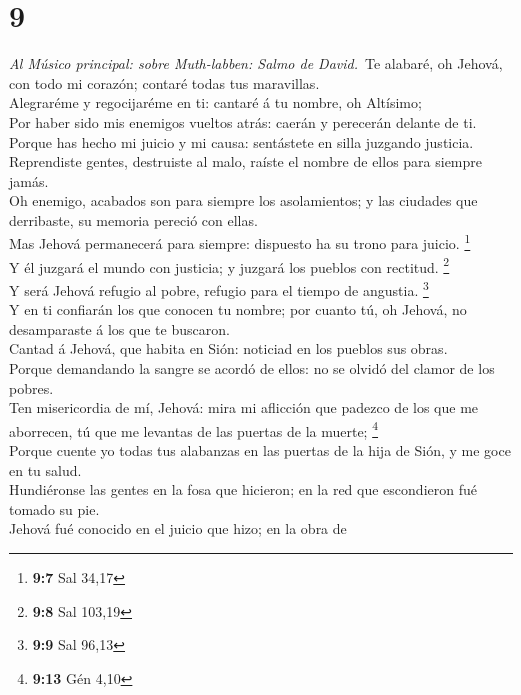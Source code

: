 \hypertarget{section-8}{%
\section{9}\label{section-8}}

 \emph{Al Músico principal: sobre Muth-labben: Salmo de
David.}~Te alabaré, oh Jehová, con todo mi corazón; contaré todas tus
maravillas.\\
 Alegraréme y regocijaréme en ti: cantaré á tu nombre, oh
Altísimo;\\
 Por haber sido mis enemigos vueltos atrás: caerán y
perecerán delante de ti.\\
 Porque has hecho mi juicio y mi causa: sentástete en silla
juzgando justicia.\\
 Reprendiste gentes, destruiste al malo, raíste el nombre de
ellos para siempre jamás.\\
 Oh enemigo, acabados son para siempre los asolamientos; y
las ciudades que derribaste, su memoria pereció con ellas.\\
 Mas Jehová permanecerá para siempre: dispuesto ha su trono
para juicio. \footnote{\textbf{9:7} Sal 34,17}\\
 Y él juzgará el mundo con justicia; y juzgará los pueblos
con rectitud. \footnote{\textbf{9:8} Sal 103,19}\\
 Y será Jehová refugio al pobre, refugio para el tiempo de
angustia. \footnote{\textbf{9:9} Sal 96,13}\\
 Y en ti confiarán los que conocen tu nombre; por cuanto
tú, oh Jehová, no desamparaste á los que te buscaron.\\
 Cantad á Jehová, que habita en Sión: noticiad en los
pueblos sus obras.\\
 Porque demandando la sangre se acordó de ellos: no se
olvidó del clamor de los pobres.\\
 Ten misericordia de mí, Jehová: mira mi aflicción que
padezco de los que me aborrecen, tú que me levantas de las puertas de la
muerte; \footnote{\textbf{9:13} Gén 4,10}\\
 Porque cuente yo todas tus alabanzas en las puertas de la
hija de Sión, y me goce en tu salud.\\
 Hundiéronse las gentes en la fosa que hicieron; en la red
que escondieron fué tomado su pie.\\
 Jehová fué conocido en el juicio que hizo; en la obra de
